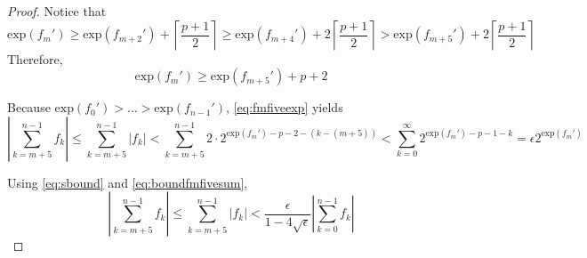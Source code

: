 \documentclass[12pt]{article}
\providecommand{\ceil}[1]{\left \lceil #1 \right \rceil }
\providecommand{\exp}{\ensuremath{\text{exp}}}
\theoremstyle{definition}
\numberwithin{equation}{section}
\numberwithin{figure}{section}
\begin{document}
\begin{proof}

      Notice that
        \begin{equation*}
          \exp(f_m') \geq \exp(f_{m + 2}') + \ceil{\frac{p+ 1}{2}} \geq \exp(f_{m + 4}') + 2  \ceil{\frac{p + 1}{2}} > \exp(f_{m + 5}')+ 2  \ceil{\frac{p+ 1}{2}}
        \end{equation*}
      Therefore,
        \begin{equation}
          \exp(f_m') \geq \exp(f_{m + 5}') + p + 2
          \label{eq:fmfiveexp}
        \end{equation}

      Because $\exp(f_0') > ... > \exp(f_{n - 1}')$, \eqref{eq:fmfiveexp} yields
        \begin{equation}
          |\sum\limits_{k = m + 5}^{n - 1} f_k| \leq \sum\limits_{k = m + 5}^{n - 1} |f_k| < \sum\limits_{k = m + 5}^{n - 1} 2 \cdot 2^{\exp(f_m') - p - 2 - (k - (m + 5))} < \sum\limits_{k = 0}^{\infty} 2^{\exp(f_m') - p - 1 - k} = \epsilon 2^{\exp(f_m')}
          \label{eq:boundfmfivesum}
        \end{equation}

      Using  \eqref{eq:sbound} and \eqref{eq:boundfmfivesum},
        \begin{equation}
          |\sum\limits_{k = m + 5}^{n - 1} f_k| \leq \sum\limits_{k = m + 5}^{n - 1} |f_k| < \frac{\epsilon}{1 - 4  \sqrt\epsilon}|\sum\limits_{k = 0}^{n - 1} f_k|
          \label{eq:relsboundfmfivesum}
        \end{equation}


\end{proof}
\end{document}

